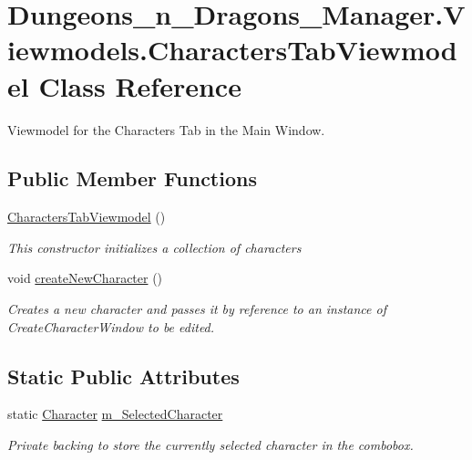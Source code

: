 \hypertarget{class_dungeons__n___dragons___manager_1_1_viewmodels_1_1_characters_tab_viewmodel}{}\section{Dungeons\+\_\+n\+\_\+\+Dragons\+\_\+\+Manager.\+Viewmodels.\+Characters\+Tab\+Viewmodel Class Reference}
\label{class_dungeons__n___dragons___manager_1_1_viewmodels_1_1_characters_tab_viewmodel}


Viewmodel for the Characters Tab in the Main Window.  


\subsection*{Public Member Functions}
\begin{DoxyCompactItemize}
\item 
\mbox{\hyperlink{class_dungeons__n___dragons___manager_1_1_viewmodels_1_1_characters_tab_viewmodel_ab001c7ea5b66f3632f03c1edc6391e68}{Characters\+Tab\+Viewmodel}} ()
\begin{DoxyCompactList}\small\item\em This constructor initializes a collection of characters \end{DoxyCompactList}\item 
void \mbox{\hyperlink{class_dungeons__n___dragons___manager_1_1_viewmodels_1_1_characters_tab_viewmodel_a7aeddecf7e41392af7de68198b092b43}{create\+New\+Character}} ()
\begin{DoxyCompactList}\small\item\em Creates a new character and passes it by reference to an instance of Create\+Character\+Window to be edited. \end{DoxyCompactList}\end{DoxyCompactItemize}
\subsection*{Static Public Attributes}
\begin{DoxyCompactItemize}
\item 
static \mbox{\hyperlink{class_dungeons__n___dragons___manager_1_1_models_1_1_character}{Character}} \mbox{\hyperlink{class_dungeons__n___dragons___manager_1_1_viewmodels_1_1_characters_tab_viewmodel_a76b61200033a07228b4317ce675dcd3e}{m\+\_\+\+Selected\+Character}}
\begin{DoxyCompactList}\small\item\em Private backing to store the currently selected character in the combobox. \end{DoxyCompactList}\end{DoxyCompactItemize}
